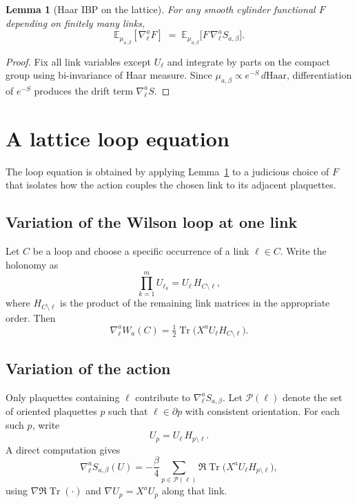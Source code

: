 \documentclass[11pt]{article}
\newtheorem{lemma}[theorem]{Lemma}
\theoremstyle{definition}
\newcommand{\1}{\mathbf{1}}
\newcommand{\Tr}{\operatorname{Tr}}
\begin{document}
\begin{lemma}[Haar IBP on the lattice]
\label{lem:ibp}
For any smooth cylinder functional $F$ depending on finitely many links,
\begin{equation}
\mathbb E_{\mu_{a,\beta}}[\nabla^{a}_{\ell}F]\;=\;\mathbb E_{\mu_{a,\beta}}\big[F\,\nabla^{a}_{\ell}S_{a,\beta}\big].
\end{equation}
\end{lemma}

\begin{proof}
Fix all link variables except $U_\ell$ and integrate by parts on the compact group using bi-invariance of Haar measure. Since $\mu_{a,\beta}\propto e^{-S}\,d\mathrm{Haar}$, differentiation of $e^{-S}$ produces the drift term $\nabla^{a}_{\ell}S$.
\end{proof}

\section{A lattice loop equation}

The loop equation is obtained by applying Lemma~\ref{lem:ibp} to a judicious choice of $F$ that isolates how the action couples the chosen link to its adjacent plaquettes.

\subsection{Variation of the Wilson loop at one link}

Let $C$ be a loop and choose a specific occurrence of a link $\ell\in C$. Write the holonomy as
\begin{equation}
\prod_{k=1}^m U_{\ell_k} = U_\ell\,H_{C\setminus \ell},
\end{equation}
where $H_{C\setminus \ell}$ is the product of the remaining link matrices in the appropriate order.
Then
\begin{equation}
\nabla^{a}_{\ell}W_a(C)=\tfrac12\Tr\big(X^a U_\ell H_{C\setminus \ell}\big).
\end{equation}

\subsection{Variation of the action}

Only plaquettes containing $\ell$ contribute to $\nabla^{a}_{\ell}S_{a,\beta}$. Let $\mathcal P(\ell)$ denote the set of oriented plaquettes $p$ such that $\ell\in\partial p$ with consistent orientation. For each such $p$, write
\begin{equation}
U_p = U_\ell\,H_{p\setminus \ell}.
\end{equation}
A direct computation gives
\begin{equation}
\nabla^{a}_{\ell}S_{a,\beta}(U)= -\frac{\beta}{4}\sum_{p\in\mathcal P(\ell)}\Re\Tr\big(X^a U_\ell H_{p\setminus \ell}\big),
\end{equation}
using $\nabla\Re\Tr(\cdot)$ and $\nabla U_p = X^a U_p$ along that link.
\end{document}
